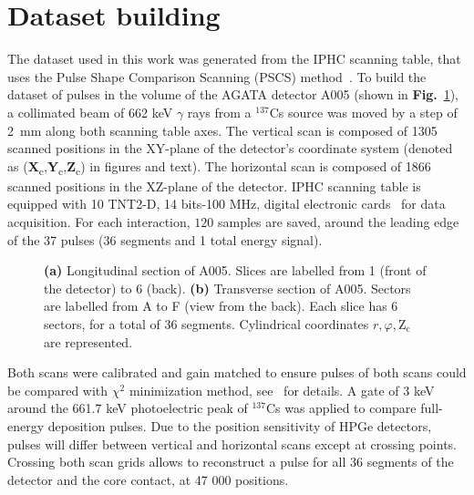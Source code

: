 \section{Dataset building}
\label{sec:dataset_building}
The dataset used in this work was generated from the IPHC scanning table, that uses the Pulse Shape Comparison Scanning (PSCS) method~\cite{Crespi2008}. To build the dataset of pulses in the volume of the AGATA detector A005 (shown in \textbf{Fig.}~\ref{fig:a005_geometry}), a collimated beam of 662 keV $\gamma$ rays from a $^{137}$Cs source was moved by a step of 2~mm along both scanning table axes. The vertical scan is composed of 1305 scanned positions in the XY-plane of the detector's coordinate system (denoted as (\textbf{X}\textsubscript{c},\textbf{Y}\textsubscript{c},\textbf{Z}\textsubscript{c}) in figures and text). The horizontal scan is composed of 1866 scanned positions in the XZ-plane of the detector. IPHC scanning table is equipped with 10 TNT2-D, 14 bits-100 MHz, digital electronic cards~\cite{Arnold2005} for data acquisition. For each interaction, $120$ samples are saved, around the leading edge of the 37 pulses (36 segments and 1 total energy signal).

\begin{figure}
\centering
{}
\caption{\textbf{(a)} Longitudinal section of A005. Slices are labelled from 1 (front of the detector) to 6 (back). \textbf{(b)} Transverse section of A005. Sectors are labelled from A to F (view from the back). Each slice has 6 sectors, for a total of 36 segments. Cylindrical coordinates $r, \varphi, \text{Z}_\text{c}$ are represented. }
\label{fig:a005_geometry}
\end{figure}

Both scans were calibrated and gain matched to ensure pulses of both scans could be compared with $\chi^2$ minimization method, see~\cite{DeCanditiis2020SimulationsDetector} for details. A gate of 3 keV around the 661.7 keV photoelectric peak of $^{137}$Cs was applied to compare full-energy deposition pulses. Due to the position sensitivity of HPGe detectors, pulses will differ between vertical and horizontal scans except at crossing points. Crossing both scan grids allows to reconstruct a pulse for all 36 segments of the detector and the core contact, at 47 000 positions. 

